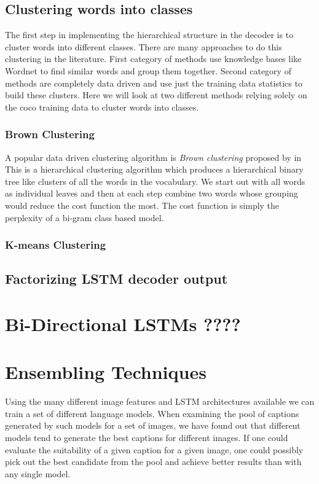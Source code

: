 \subsection{Clustering words into classes}
The first step in implementing the hierarchical structure in the decoder is to
cluster words into different classes.
There are many approaches to do this clustering in the literature.
First category of methods use knowledge bases like Wordnet to find similar words
and group them together.
Second category of methods are completely data driven and use just the training
data statistics to build these clusters.
Here we will look at two different methods relying solely on the coco training
data to cluster words into classes.

\subsubsection{Brown Clustering}
A popular data driven clustering algorithm is \emph{Brown clustering} proposed
by in~\cite{BrownClust}
This is a hierarchical clustering algorithm which produces a hierarchical binary
tree like clusters of all the words in the vocabulary.
We start out with all words as individual leaves and then at each step combine
two words whose grouping would reduce the cost function the most.
The cost function is simply the perplexity of a bi-gram class based model.

\subsubsection{K-means Clustering}

\subsection{Factorizing LSTM decoder output}

\section{Bi-Directional LSTMs ????}
\section{Ensembling Techniques}
Using the many different image features and LSTM architectures available we can
train a set of different language models.
When examining the pool of captions generated by such models for a set of
images, we have found out that different models tend to generate the best
captions for different images.
If one could evaluate the suitability of a given caption for a given image, one
could possibly pick out the best candidate from the pool and achieve better
results than with any single model.

